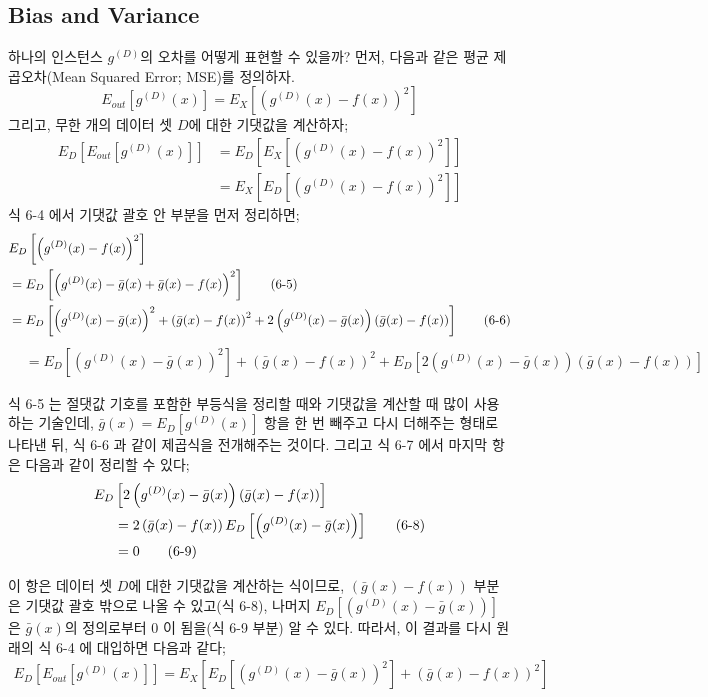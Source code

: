 \documentclass[a4paper]{oblivoir}
\begin{document}
\subsection{Bias and Variance}
하나의 인스턴스  $g^{(D)}$의 오차를 어떻게 표현할 수 있을까? 먼저, 다음과 같은 평균 제곱오차(Mean Squared Error; MSE)를 정의하자.
\begin{equation}E_{out}[g^{(D)}(x)] = E_{X}\left[\left(g^{(D)}(x) - f(x)\right)^{2}\right]\tag{6-2} \end{equation}
그리고, 무한 개의 데이터 셋 $D$에 대한 기댓값을 계산하자;
\begin{align}
E_{D}\left[ E_{out}[g^{(D)}(x)] \right] &= E_{D}\left[ E_{X}\left[\left(g^{(D)}(x) - f(x)\right)^{2}\right] \right] \tag{6-3} \\
&=E_{X}\left[ E_{D}\left[ \left( g^{(D)}(x) - f(x) \right)^{2} \right] \right] \tag{6-4}
\end{align}
식 6-4 에서 기댓값 괄호 안 부분을 먼저 정리하면;
\begin{align}
&E_{D}\left[ \left( g^{(D)}(x) - f(x) \right)^{2} \right] \notag \\
&= E_{D}\left[ \left( g^{(D)}(x) - \bar{g}(x) + \bar{g}(x) - f(x) \right)^{2} \right] \tag{6-5} \\
&= E_{D}\left[\left(g^{(D)}(x)-\bar{g}(x)\right)^{2}+\left(\bar{g}(x)-f(x)\right)^{2}+2\left(g^{(D)}(x)-\bar{g}(x) \right) \left(\bar{g}(x)-f(x) \right) \right] \tag{6-6}
\end{align}
\begin{align}
&= E_{D}\left[\left(g^{(D)}(x)-\bar{g}(x)\right)^{2} \right]+\left(\bar{g}(x)-f(x) \right)^{2}+E_{D}\left[2\left(g^{(D)}(x)-\bar{g}(x)\right) \left(\bar{g}(x) - f(x) \right) \right] \tag{6-7}
\end{align}

\indent 식 6-5 는 절댓값 기호를 포함한 부등식을 정리할 때와 기댓값을 계산할 때 많이 사용하는 기술인데, $\bar{g}(x) = E_{D}[g^{(D)}(x)]$ 항을 한 번 빼주고 다시 더해주는 형태로 나타낸 뒤, 식 6-6 과 같이 제곱식을 전개해주는 것이다. 그리고 식 6-7 에서 마지막 항은 다음과 같이 정리할 수 있다;
\begin{align}
E_{D}&\left[2\left(g^{(D)}(x)-\bar{g}(x)\right) \left(\bar{g}(x) - f(x) \right) \right] \notag \\
&=2\left(\bar{g}(x) - f(x) \right) E_{D}\left[\left(g^{(D)}(x)-\bar{g}(x)\right) \right] \tag{6-8} \\
&= 0 \tag{6-9}
\end{align}

\indent 이 항은 데이터 셋 $D$에 대한 기댓값을 계산하는 식이므로, $\left(\bar{g}(x)-f(x) \right)$ 부분은 기댓값 괄호 밖으로 나올 수 있고(식 6-8), 나머지 $E_{D}\left[\left(g^{(D)}(x) - \bar{g}(x) \right) \right]$ 은 $\bar{g}(x)$의 정의로부터 0 이 됨을(식 6-9 부분) 알 수 있다. 따라서, 이 결과를 다시 원래의 식 6-4 에 대입하면 다음과 같다;
\begin{align}
E_{D}\left[E_{out}\left[g^{(D)}(x) \right] \right]=E_{X}\left[E_{D}\left[\left(g^{(D)}(x)-\bar{g}(x) \right)^{2} \right]+\left(\bar{g}(x)-f(x) \right)^{2} \right] \tag{6-10}
\end{align}
\end{document}
